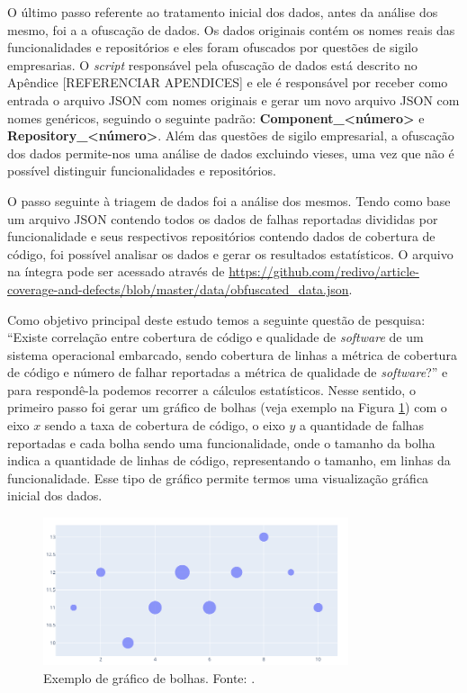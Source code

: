 \documentclass[11.5pt]{article}
\begin{document}
O último passo referente ao tratamento inicial dos dados, antes da análise dos mesmo, foi a
a ofuscação de dados.
Os dados originais contém os nomes reais das funcionalidades e repositórios e eles foram ofuscados
por questões de sigilo empresarias.
O \textit{script} responsável pela ofuscação de dados está descrito no Apêndice [REFERENCIAR APENDICES]
e ele é responsável por receber como entrada o arquivo JSON com nomes originais e gerar um novo
arquivo JSON com nomes genéricos, seguindo o seguinte padrão:
\textbf{Component\_\textless número\textgreater} e
\textbf{Repository\_\textless número\textgreater}.
Além das questões de sigilo empresarial, a ofuscação dos dados permite-nos uma análise de dados
excluindo vieses, uma vez que não é possível distinguir funcionalidades e repositórios.

O passo seguinte à triagem de dados foi a análise dos mesmos.
Tendo como base um arquivo JSON contendo todos os dados de falhas reportadas divididas por
funcionalidade e seus respectivos repositórios contendo dados de cobertura de código, foi possível
analisar os dados e gerar os resultados estatísticos.
O arquivo na íntegra pode ser acessado através de
\url{https://github.com/redivo/article-coverage-and-defects/blob/master/data/obfuscated_data.json}.

Como objetivo principal deste estudo temos a seguinte questão de pesquisa:
``Existe correlação entre cobertura de código e qualidade de \textit{software} de um sistema
operacional embarcado, sendo cobertura de linhas a métrica de cobertura de código e número de falhar
reportadas a métrica de qualidade de \textit{software}?'' e para respondê-la podemos recorrer a
cálculos estatísticos.
Nesse sentido, o primeiro passo foi gerar um gráfico de bolhas (veja exemplo na
Figura \ref{fig:bubble_example}) com o eixo $x$ sendo a taxa de cobertura de código, o eixo $y$ a
quantidade de falhas reportadas e cada bolha sendo uma funcionalidade, onde o tamanho da bolha
indica a quantidade de linhas de código, representando o tamanho, em linhas da funcionalidade.
Esse tipo de gráfico permite termos uma visualização gráfica inicial dos dados.

\begin{figure}[ht]
    \centering
    \includegraphics[width=0.8\textwidth]{bubble_example.png}
    \caption{Exemplo de gráfico de bolhas. Fonte: \cite{plotly}.}
    \label{fig:bubble_example}
\end{figure}
\end{document}
